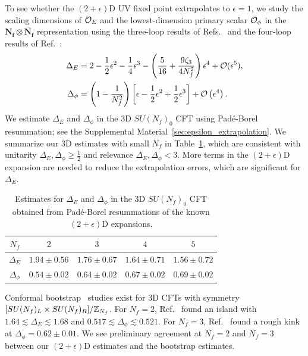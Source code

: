 \documentclass[
 reprint,







nofootinbib,


 amsmath,amssymb,
 aps,
 prd






tightenlines
]{revtex4-2}
\begin{document}
To see whether the $(2+\epsilon)$D UV fixed point extrapolates to
$\epsilon=1$, we study the scaling dimensions of $\mathcal{O}_E$ and the lowest-dimension
primary scalar $\mathcal{O}_{\phi}$ in the
$\boldsymbol{N_f}\otimes\overline{\boldsymbol{N_f}}$ representation using
the three-loop results of
Refs.~\cite{McKane:1979cm,Hikami:1980hi,Hikami:1982ak} and the four-loop results of Ref.~\cite{Wegner:1989ss}:
\begin{subequations}
\begin{align}
    \Delta_E &= 2 - \frac{1}{2}\epsilon^2 - \frac{1}{4}\epsilon^3
    - \left( \frac{5}{16} + \frac{9\zeta_3}{4N_f^2} \right)\epsilon^4
    + \mathcal{O}(\epsilon^5),\\
    \Delta_{\phi} &= \left(1-\frac{1}{N_f^2}\right)\left[\epsilon
    - \frac{1}{2}  \epsilon^2 +  \frac{1}{2} \epsilon^3\right]
    +\mathcal{O}\left(\epsilon ^4\right).
\end{align}
\end{subequations}
We estimate $\Delta_E$ and $\Delta_{\phi}$ in the 3D $SU(N_f)_0$ CFT using
Pad\'e-Borel resummation; see the Supplemental Material~\ref{sec:epsilon_extrapolation}.
We summarize our
3D estimates with small $N_f$ in Table~\ref{tab:Delta_phi_estimates}, which are consistent with unitarity $\Delta_E,\Delta_{\phi} \ge \frac{1}{2}$ and relevance $\Delta_E,\Delta_{\phi} < 3$.
More terms in the $(2+\epsilon)$D expansion are needed to reduce the extrapolation errors, which are significant for $\Delta_{E}$.
\begin{table}[ht]
    \centering
    \renewcommand{\arraystretch}{1.5}
    \begin{tabular}{|c|c|c|c|c|}
        \hline
        $N_f$ & $2$ & $3$ & $4$ & $5$ \\
        \hline
        $\Delta_E$ & $1.94\pm 0.56$ & $1.76\pm 0.67$ & $1.64\pm 0.71$ & $1.56\pm 0.72$ \\
        \hline
        $\Delta_{\phi}$ & $0.54 \pm 0.02$ & $0.64 \pm 0.02$ & $0.67 \pm
        0.02$ & $0.69 \pm
        0.02$ \\
        \hline
    \end{tabular}
    \caption{Estimates for $\Delta_E$ and $\Delta_{\phi}$ in the 3D $SU(N_f)_0$ CFT obtained from Pad\'e-Borel resummations of the known $(2+\epsilon)$D expansions.}
    \label{tab:Delta_phi_estimates}
\end{table}

Conformal bootstrap~\cite{Poland:2018epd} studies exist for 3D CFTs with symmetry
$[SU(N_f)_L\times SU(N_f)_R]/\mathbb{Z}_{N_f}$. For $N_f = 2$,
Ref.~\cite{Kos:2015mba} found an island with $1.64\lesssim \Delta_E\lesssim 1.68$ and
$0.517 \lesssim \Delta_{\phi} \lesssim 0.521$. For $N_f=3$,
Ref.~\cite{Kousvos:2022ewl} found a rough kink at $\Delta_{\phi} = 0.62 \pm
0.01$. We see preliminary agreement at $N_f=2$
and $N_f = 3$ between our $(2 + \epsilon)$D estimates
and the bootstrap estimates.
\end{document}

